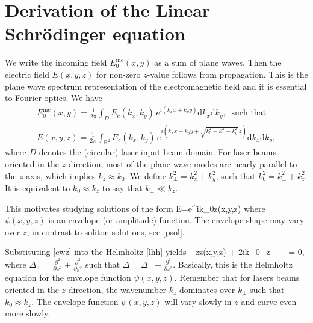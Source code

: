 \section{Derivation of the Linear Schr\"odinger equation}
\label{parax}
We write the incoming field $E_0^\text{inc}(x,y)$ as a sum of plane waves. Then
the electric field $E(x,y,z)$ for non-zero $z$-value follows from propagation.
This is the plane wave spectrum representation of the electromagnetic field and
it is essential to Fourier optics. We have
%
\begin{gather*} 
E_0^\text{inc}(x,y) = \frac{1}{2\pi}\int_D E_c(k_x,k_y)\, e^{i(k_x x+k_y y)}
\mathrm{d}k_x\mathrm{d}k_y,~\text{ such that }\\ 
E(x,y,z) = \frac{1}{2\pi}\int_{\mathbb{R}^2} E_c(k_x,k_y)\,e^{i(k_x x+k_y y+
\sqrt{k_0^2-k_x^2-k_y^2}\,z)}\mathrm{d}k_x\mathrm{d}k_y,
\end{gather*}
%
where $D$ denotes the (circular) laser input beam domain. 
For laser beams oriented in the $z$-direction, most of the plane wave modes 
are nearly parallel to the $z$-axis, which implies $k_z\approx k_0$. We define
$k_\perp^2 = k_x^2 + k_y^2$, such that $k_0^2 = k_\perp^2 + k_z^2$. It is
equivalent to $k_0\approx k_z$ to say that $k_\perp \ll k_z$. 

This motivates studying solutions of the form
\be \label{cwz}
E=e^{ik_0z}\psi(x,y,z)
\ee
%
where $\psi(x,y,z)$ is an envelope (or amplitude) function. The envelope shape
may vary over $z$, in contrast to soliton solutions, see \eqref{psol}. 

Substituting \eqref{cwz} into the Helmholtz \cref{lhh} yields
%
\be \label{phh}
\psi_{zz}(x,y,z) + 2ik_0\psi_z + \Delta_\perp\psi = 0,
\ee
%
where $\Delta_\perp=\frac{\partial^2}{\partial x^2}
+\frac{\partial^2}{\partial y^2}$ such that $\Delta = \Delta_\perp + 
\frac{\partial^2}{\partial z^2}$. Basically, this is the Helmholtz equation for
the envelope function $\psi(x,y,z)$. Remember that for lasers beams oriented in
the $z$-direction, the wavenumber $k_z$ dominates over $k_\perp$ such that 
$k_0\approx k_z$. The envelope function $\psi(x,y,z)$  will vary slowly 
in $z$ and curve even more slowly. 

